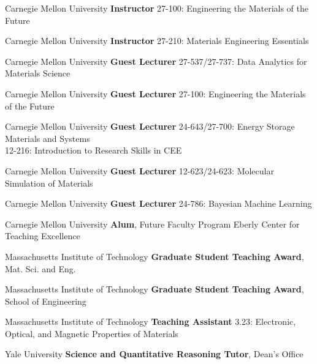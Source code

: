 \vspace{-1mm}
    {Carnegie Mellon University}
    {\textbf{Instructor}}
    {27-100: Engineering the Materials of the Future}

\vspace{-2mm}
    {Carnegie Mellon University}
    {\textbf{Instructor}}
    {27-210: Materials Engineering Essentials}

\vspace{-2mm}
\datedsubsection{}
    {Carnegie Mellon University}
    {\textbf{Guest Lecturer}}
    {27-537/27-737: Data Analytics for Materials Science}

\vspace{-2mm}
    {Carnegie Mellon University}
    {\textbf{Guest Lecturer}}
    {27-100: Engineering the Materials of the Future}

\vspace{-2mm}
    {Carnegie Mellon University}
    {\textbf{Guest Lecturer}}
    {24-643/27-700: Energy Storage Materials and Systems\\
    12-216: Introduction to Research Skills in CEE}

\vspace{-2mm}
    {Carnegie Mellon University}
    {\textbf{Guest Lecturer}}
    {12-623/24-623: Molecular Simulation of Materials}

\vspace{-2mm}
    {Carnegie Mellon University}
    {\textbf{Guest Lecturer}}
    {24-786: Bayesian Machine Learning}

\vspace{-2mm}
    {Carnegie Mellon University}
    {\textbf{Alum}, Future Faculty Program}
    {Eberly Center for Teaching Excellence}

\newpage
{}
    {Massachusetts Institute of Technology}
    {\textbf{Graduate Student Teaching Award}, Mat. Sci. and Eng.}{}

\datedsubsectionnarrow{}
    {Massachusetts Institute of Technology}
    {\textbf{Graduate Student Teaching Award}, School of Engineering}{}

\vspace{-2mm}
    {Massachusetts Institute of Technology}
    {\textbf{Teaching Assistant}}
    {3.23: Electronic, Optical, and Magnetic Properties of Materials}

\vspace{2.2mm}
    {Yale University}
    {\textbf{Science and Quantitative Reasoning Tutor}, Dean's Office}{}
